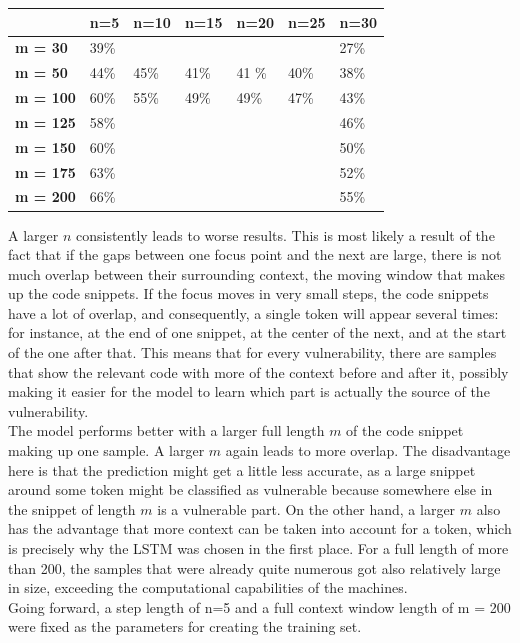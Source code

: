 \documentclass[
a4paper,
pagesize,
pdftex,
12pt,
twoside, %
BCOR=5mm, %
ngerman,
fleqn,
final,
]{scrartcl}
\begin{document}
	\begin{tabular}{|p{2cm}||p{1.7cm}|p{1.7cm}|p{1.7cm}|p{1.7cm}|p{1.7cm}|p{1.7cm}|}
		\hline
		& \textbf{n=5} &\textbf{n=10} & \textbf{n=15} & \textbf{n=20} & \textbf{n=25} & \textbf{n=30} \\
		\hline
		\textbf{m = 30} & 39\% &  &  & &  & 27\% \\ 
		\textbf{m = 50} & 44\% & 45\% &41\% &41 \%& 40\% & 38\% \\ 
		\textbf{m = 100} & 60\% & 55\% &49\% &49\%&  47\% &43\% \\
		\textbf{m = 125} & 58\% &  &  & &  & 46\% \\
		\textbf{m = 150} & 60\% &  &  & &  & 50\% \\
		\textbf{m = 175} & 63\% &  &  & &  & 52\% \\
		\textbf{m = 200} & 66\% &  &  & &  & 55\% \\
		\hline
		\hline
	\end{tabular}
	
	A larger $n$ consistently leads to worse results. This is most likely a result of the fact that if the gaps between one focus point and the next are large, there is not much overlap between their surrounding context, the moving window that makes up the code snippets. If the focus moves in very small steps, the code snippets have a lot of overlap, and consequently, a single token will appear several times: for instance, at the end of one snippet, at the center of the next, and at the start of the one after that. This means that for every vulnerability, there are samples that show the relevant code with more of the context before and after it, possibly making it easier for the model to learn which part is actually the source of the vulnerability.\\
	The model performs better with a larger full length $m$ of the code snippet making up one sample. A larger $m$ again leads to more overlap. The disadvantage here is that the prediction might get a little less accurate, as a large snippet around some token might be classified as vulnerable because somewhere else in the snippet of length $m$ is a vulnerable part. On the other hand, a larger $m$ also has the advantage that more context can be taken into account for a token, which is precisely why the LSTM was chosen in the first place. For a full length of more than 200, the samples that were already quite numerous got also relatively large in size, exceeding the computational capabilities of the machines. \\
	Going forward, a step length of n=5 and a full context window length of m = 200 were fixed as the parameters for creating the training set.
	
\end{document}
